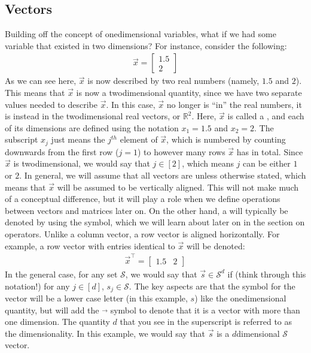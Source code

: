 \documentclass[letterpaper,10pt,english]{jupyterBook}
\begin{document}
\subsection{Vectors}
\label{\detokenize{introduction/terminology:vectors}}
\sphinxAtStartPar
Building off the concept of one\sphinxhyphen{}dimensional variables, what if we had some variable that existed in two dimensions? For instance, consider the following:
\begin{align*}
    \vec x = \begin{bmatrix}1.5 \\ 2\end{bmatrix}
\end{align*}
\sphinxAtStartPar
As we can see here, \(\vec x\) is now described by two real numbers (namely, \(1.5\) and \(2\)). This means that \(\vec x\) is now a two\sphinxhyphen{}dimensional quantity, since we have two separate values needed to describe \(\vec x\). In this case, \(\vec x\) no longer is “in” the real numbers, it is instead in the two\sphinxhyphen{}dimensional real vectors, or \(\mathbb R^2\). Here, \(\vec x\) is called a , and each of its dimensions are defined using the notation \(x_1 = 1.5\) and \(x_2 = 2\). The subscript \(x_j\) just means the \(j^{th}\) element of \(\vec x\), which is numbered by counting downwards from the first row (\(j = 1\)) to however many rows \(\vec x\) has in total. Since \(\vec x\) is two\sphinxhyphen{}dimensional, we would say that \(j \in [2]\), which means \(j\) can be either \(1\) or \(2\). In general, we will assume that all vectors are  unless otherwise stated, which means that \(\vec x\) will be assumed to be vertically aligned. This will not make much of a conceptual difference, but it will play a role when we define operations between vectors and matrices later on. On the other hand, a  will typically be denoted by using the  symbol, which we will learn about later on in the section on operators. Unlike a column vector, a row vector is aligned horizontally. For example, a row vector with entries identical to \(\vec x\) will be denoted:
\begin{align*}
    \vec x^\top = \begin{bmatrix}1.5 & 2\end{bmatrix}
\end{align*}
\sphinxAtStartPar
In the general case, for any set \(\mathcal S\), we would say that \(\vec s \in \mathcal S^d\) if (think through this notation!) for any \(j \in [d]\), \(s_j \in \mathcal S\). The key aspects are that the symbol for the vector will be a lower case letter (in this example, \(s\)) like the one\sphinxhyphen{}dimensional quantity, but will add the \(\vec{}\) symbol to denote that it is a vector with more than one dimension. The quantity \(d\) that you see in the superscript is referred to as the dimensionality. In this example, we would say that \(\vec s\) is a \(d\)\sphinxhyphen{}dimensional \(\mathcal S\)\sphinxhyphen{}vector.
\end{document}
